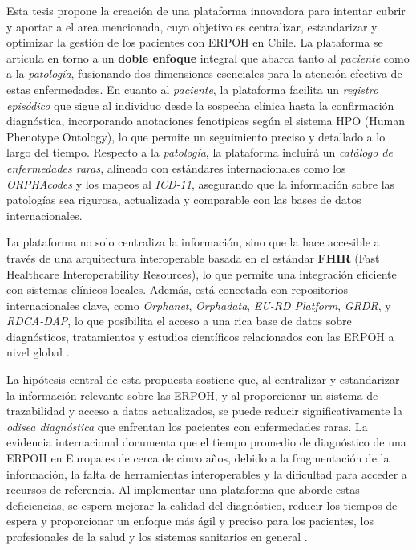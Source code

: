 \documentclass{article}
\begin{document}
Esta tesis propone la creación de una plataforma innovadora para intentar cubrir y aportar a el area mencionada, cuyo objetivo es centralizar, estandarizar y optimizar la gestión de los pacientes con ERPOH en Chile. La plataforma se articula en torno a un \textbf{doble enfoque} integral que abarca tanto al \textit{paciente} como a la \textit{patología}, fusionando dos dimensiones esenciales para la atención efectiva de estas enfermedades. En cuanto al \textit{paciente}, la plataforma facilita un \textit{registro episódico} que sigue al individuo desde la sospecha clínica hasta la confirmación diagnóstica, incorporando anotaciones fenotípicas según el sistema HPO (Human Phenotype Ontology), lo que permite un seguimiento preciso y detallado a lo largo del tiempo. Respecto a la \textit{patología}, la plataforma incluirá un \textit{catálogo de enfermedades raras}, alineado con estándares internacionales como los \textit{ORPHAcodes} y los mapeos al \textit{ICD-11}, asegurando que la información sobre las patologías sea rigurosa, actualizada y comparable con las bases de datos internacionales.

La plataforma no solo centraliza la información, sino que la hace accesible a través de una arquitectura interoperable basada en el estándar \textbf{FHIR} (Fast Healthcare Interoperability Resources), lo que permite una integración eficiente con sistemas clínicos locales. Además, está conectada con repositorios internacionales clave, como \textit{Orphanet}, \textit{Orphadata}, \textit{EU-RD Platform}, \textit{GRDR}, y \textit{RDCA-DAP}, lo que posibilita el acceso a una rica base de datos sobre diagnósticos, tratamientos y estudios científicos relacionados con las ERPOH a nivel global \cite{orpha2025,orphacode2025,eurd2025,grdr2025,rdcadap2025,whoicd11faq}.

La hipótesis central de esta propuesta sostiene que, al centralizar y estandarizar la información relevante sobre las ERPOH, y al proporcionar un sistema de trazabilidad y acceso a datos actualizados, se puede reducir significativamente la \textit{odisea diagnóstica} que enfrentan los pacientes con enfermedades raras. La evidencia internacional documenta que el tiempo promedio de diagnóstico de una ERPOH en Europa es de cerca de cinco años, debido a la fragmentación de la información, la falta de herramientas interoperables y la dificultad para acceder a recursos de referencia. Al implementar una plataforma que aborde estas deficiencias, se espera mejorar la calidad del diagnóstico, reducir los tiempos de espera y proporcionar un enfoque más ágil y preciso para los pacientes, los profesionales de la salud y los sistemas sanitarios en general \cite{eurordis2024,schuermans2022}.
\end{document}
